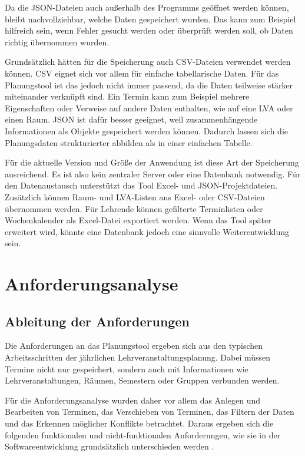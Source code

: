 \documentclass[12pt,a4paper]{article}
\begin{document}
Da die JSON-Dateien auch außerhalb des Programms geöffnet werden können, bleibt nachvollziehbar, welche Daten gespeichert wurden. Das kann zum Beispiel hilfreich sein, wenn Fehler gesucht werden oder überprüft werden soll, ob Daten richtig übernommen wurden.

Grundsätzlich hätten für die Speicherung auch CSV-Dateien verwendet werden können. CSV eignet sich vor allem für einfache tabellarische Daten. Für das Planungstool ist das jedoch nicht immer passend, da die Daten teilweise stärker miteinander verknüpft sind. Ein Termin kann zum Beispiel mehrere Eigenschaften oder Verweise auf andere Daten enthalten, wie auf eine LVA oder einen Raum.
JSON ist dafür besser geeignet, weil zusammenhängende Informationen als Objekte gespeichert werden können. Dadurch lassen sich die Planungsdaten strukturierter abbilden als in einer einfachen Tabelle.

Für die aktuelle Version und Größe der Anwendung ist diese Art der Speicherung ausreichend. Es ist also kein zentraler Server oder eine Datenbank notwendig. Für den Datenaustausch unterstützt das Tool Excel- und JSON-Projektdateien. Zusätzlich können Raum- und LVA-Listen aus Excel- oder CSV-Dateien übernommen werden. Für Lehrende können gefilterte Terminlisten oder Wochenkalender als Excel-Datei exportiert werden. Wenn das Tool später erweitert wird, könnte eine Datenbank jedoch eine sinnvolle Weiterentwicklung sein.

\clearpage

\section{Anforderungsanalyse}

\subsection{Ableitung der Anforderungen}

Die Anforderungen an das Planungstool ergeben sich aus den typischen Arbeitsschritten der jährlichen Lehrveranstaltungsplanung. Dabei müssen Termine nicht nur gespeichert, sondern auch mit Informationen wie Lehrveranstaltungen, Räumen, Semestern oder Gruppen verbunden werden.

Für die Anforderungsanalyse wurden daher vor allem das Anlegen und Bearbeiten von Terminen, das Verschieben von Terminen, das Filtern der Daten und das Erkennen möglicher Konflikte betrachtet. Daraus ergeben sich die folgenden funktionalen und nicht-funktionalen Anforderungen, wie sie in der Softwareentwicklung grundsätzlich unterschieden werden \cite{sommerville2016software}.
\end{document}
